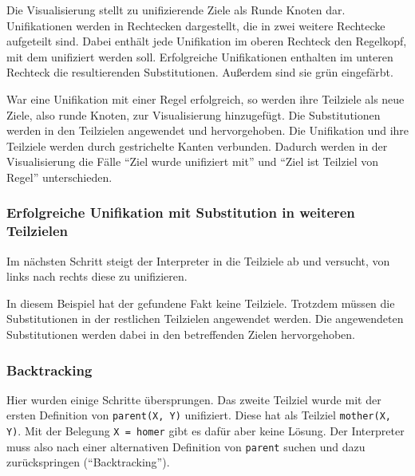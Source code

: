 \documentclass[parskip=full,11pt,twoside]{scrartcl}
\begin{document}
\begin{minipage}{\linewidth}
\end{minipage}

Die Visualisierung stellt zu unifizierende Ziele als Runde Knoten dar.
Unifikationen werden in  Rechtecken dargestellt, die in zwei weitere Rechtecke aufgeteilt sind.
Dabei enthält jede Unifikation im oberen Rechteck den Regelkopf, mit dem unifiziert werden soll.
Erfolgreiche Unifikationen enthalten im unteren Rechteck die resultierenden Substitutionen.
Außerdem sind sie grün eingefärbt.

War eine Unifikation mit einer Regel erfolgreich, so werden ihre Teilziele als neue Ziele, also runde Knoten, zur Visualisierung hinzugefügt.
Die Substitutionen werden in den Teilzielen angewendet und hervorgehoben.
Die Unifikation und ihre Teilziele werden durch gestrichelte Kanten verbunden.
Dadurch werden in der Visualisierung die Fälle \enquote{Ziel wurde unifiziert mit} und \enquote{Ziel ist Teilziel von Regel} unterschieden.

\subsubsection{Erfolgreiche Unifikation mit Substitution in weiteren Teilzielen}

Im nächsten Schritt steigt der Interpreter in die Teilziele ab und versucht, von links nach rechts diese zu unifizieren.

\begin{minipage}{\linewidth}
\end{minipage}

In diesem Beispiel hat der gefundene Fakt keine Teilziele.
Trotzdem müssen die Substitutionen in der restlichen Teilzielen angewendet werden.
Die angewendeten Substitutionen werden dabei in den betreffenden Zielen hervorgehoben.

\subsubsection{Backtracking}

Hier wurden einige Schritte übersprungen.
Das zweite Teilziel wurde mit der ersten Definition von \texttt{parent(X, Y)} unifiziert.
Diese hat als Teilziel \texttt{mother(X, Y)}.
Mit der Belegung \texttt{X = homer} gibt es dafür aber keine Lösung.
Der Interpreter muss also nach einer alternativen Definition von \texttt{parent} suchen und dazu zurückspringen (\enquote{Backtracking}).
\end{document}
